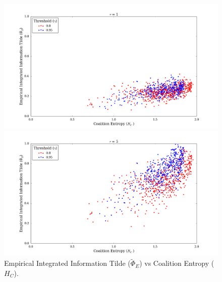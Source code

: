\documentclass[a4paper,11pt]{article}
\begin{document}
\begin{figure}[H] 
	\begin{minipage}[b]{0.5\linewidth}
		\begin{center}
		\includegraphics[scale = 0.2]{figures/snn/phi_tilde_vs_hc_1}
		\end{center}
		\vspace{4ex}
	\end{minipage}
	\begin{minipage}[b]{0.5\linewidth}
		\begin{center}
		\includegraphics[scale = 0.2]{figures/snn/phi_tilde_vs_hc_5}
		\end{center}
		\vspace{4ex}
	\end{minipage}
	\caption{
		Empirical Integrated Information Tilde ($\widetilde{\Phi}_E$) vs Coalition Entropy ($H_C$).
		\label{fig:phi_tilde_vs_hc}
	}
\end{figure}
\end{document}
